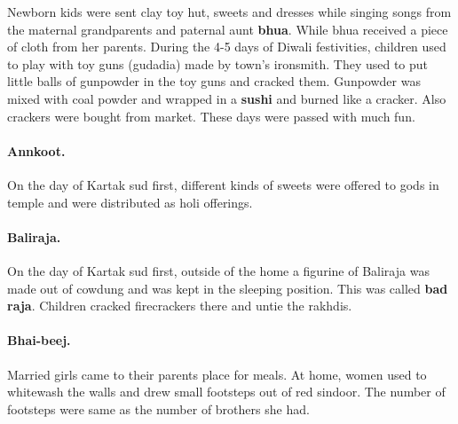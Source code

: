 Newborn kids were sent clay toy hut, sweets and dresses while singing songs
from the maternal grandparents and paternal aunt \textbf{bhua}. While bhua
received a piece of cloth from her parents.  During the 4-5 days of Diwali
festivities, children used to play with toy guns (gudadia) made by town's
ironsmith. They used to put little balls of gunpowder in the toy guns and
cracked them. Gunpowder was mixed with coal powder and wrapped in a
\textbf{sushi} and burned like a cracker. Also crackers were bought from
market.  These days were passed with much fun.  \paragraph{Annkoot.} On the day
of Kartak sud first, different kinds of sweets were offered to gods in temple
and were distributed as holi offerings.  \paragraph{Baliraja.} On the day of
Kartak sud first, outside of the home a figurine of Baliraja was made out of
cowdung and was kept in the sleeping position. This was called \textbf{bad
raja}. Children cracked firecrackers there and untie the rakhdis.
\paragraph{Bhai-beej.} Married girls came to their parents place for meals. At
home, women used to whitewash the walls and drew small footsteps out of red
sindoor. The number of footsteps were same as the number of brothers she had.
